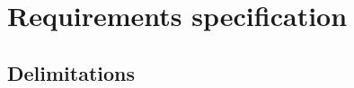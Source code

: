 \chapter{Requirements specification} \label{ch:IdealReq}

\section{Delimitations} \label{ch:Delimitations}

